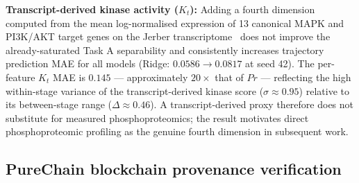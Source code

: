 \documentclass[5p,times,twocolumn]{elsarticle}
\begin{document}
\textbf{Transcript-derived kinase activity ($K_t$):}
Adding a fourth dimension computed from the mean
log-normalised expression of 13 canonical MAPK and
PI3K/AKT target genes on the Jerber
transcriptome~\cite{jerber2021population} does not improve the
already-saturated Task A separability and consistently increases
trajectory prediction MAE for all models
(Ridge: $0.0586 \to 0.0817$ at seed 42).
The per-feature $K_t$ MAE is $0.145$ --- approximately
$20\times$ that of $Pr$ --- reflecting the high within-stage
variance of the transcript-derived kinase score
($\sigma \approx 0.95$) relative to its between-stage range
($\Delta \approx 0.46$).
A transcript-derived proxy therefore does not substitute for
measured phosphoproteomics; the result motivates direct
phosphoproteomic profiling as the genuine fourth dimension
in subsequent work.

\subsection{\textbf{PureChain blockchain provenance
verification}}
\label{sec:res_dlt}

\begin{table}[!htbp]
\caption{PureChain provenance verification metrics.}
\label{tab:provenance}
\centering
{}
\end{table}
\end{document}
